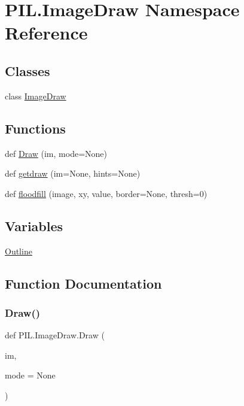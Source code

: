 \hypertarget{namespacePIL_1_1ImageDraw}{}\section{P\+I\+L.\+Image\+Draw Namespace Reference}
\label{namespacePIL_1_1ImageDraw}
\subsection*{Classes}
\begin{DoxyCompactItemize}
\item 
class \hyperlink{classPIL_1_1ImageDraw_1_1ImageDraw}{Image\+Draw}
\end{DoxyCompactItemize}
\subsection*{Functions}
\begin{DoxyCompactItemize}
\item 
def \hyperlink{namespacePIL_1_1ImageDraw_a6c01f971ba16419c06c05596924dc231}{Draw} (im, mode=None)
\item 
def \hyperlink{namespacePIL_1_1ImageDraw_a795718ecd4f1ff28d17008a4e9f97531}{getdraw} (im=None, hints=None)
\item 
def \hyperlink{namespacePIL_1_1ImageDraw_a04f749c473f734ca12218058346457a3}{floodfill} (image, xy, value, border=None, thresh=0)
\end{DoxyCompactItemize}
\subsection*{Variables}
\begin{DoxyCompactItemize}
\item 
\hyperlink{namespacePIL_1_1ImageDraw_aee58acc4f36851df639ca75bdcc41ab7}{Outline}
\end{DoxyCompactItemize}


\subsection{Function Documentation}
\mbox{\label{namespacePIL_1_1ImageDraw_a6c01f971ba16419c06c05596924dc231}} 
\subsubsection{\texorpdfstring{Draw()}{Draw()}}
{\footnotesize\ttfamily def P\+I\+L.\+Image\+Draw.\+Draw (\begin{DoxyParamCaption}\item[{}]{im,  }\item[{}]{mode = {\ttfamily None} }\end{DoxyParamCaption})}

